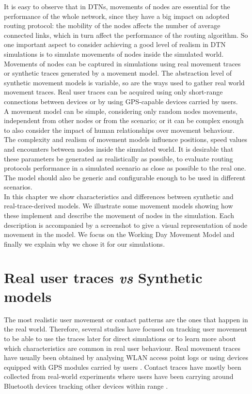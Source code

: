 It is easy to observe that in DTNs, movements of nodes are essential for the performance of the whole network, since they have a big impact on adopted routing protocol: the mobility of the nodes affects the number of average connected links, which in turn affect the performance of the routing algorithm.
So one important aspect to consider achieving a good level of realism in DTN simulations is to simulate movements of nodes inside the simulated world. 
\\

Movements of nodes can be captured in simulations using real movement traces or synthetic traces generated by a movement model. The abstraction level of synthetic movement models is variable, so are the ways used to gather real world movement traces. Real user traces can be acquired using only short-range connections between devices or by using GPS-capable devices carried by users.
\\

A movement model can be simple, considering only random nodes movements, independent from other nodes or from the scenario; or it can be complex enough to also consider the impact of human relationships over movement behaviour. The complexity and realism of movement models influence positions, speed values and encounters between nodes inside the simulated world. It is desirable that these parameters be generated as realistically as possible, to evaluate routing protocols performance in a simulated scenario as close as possible to the real one. The model should also be generic and configurable enough to be used in different scenarios.
\\

In this chapter we show characteristics and differences between synthetic and real-trace-derived models. We illustrate some movement models showing how these implement and describe the movement of nodes in the simulation. Each description is accompanied by a screenshot to give a visual representation of node movement in the model. We focus on the Working Day Movement Model and finally we explain why we chose it for our simulations.

\section{Real user traces \textit{vs} Synthetic models}
The most realistic user movement or contact patterns are the ones that happen in the real world. Therefore, several studies have focused on tracking user movement to be able to use the traces later for direct simulations or to learn more about which characteristics are common in real user behaviour. Real movement traces have usually been obtained by analysing WLAN access point logs \cite{Balachandran:2002:CUB:511399.511359} \cite{Ghosh:2006:PMP:1132983.1132993} \cite{Shaffer:2005:AMM:1104998.1105285} or using devices equipped with GPS modules carried by users \cite{Ashbrook:2002:LSL:862896.881068}. Contact traces have mostly been collected from real-world experiments where users have been carrying around Bluetooth devices tracking other devices within range \cite{Natarajan:2007:UUI:1762888.1762904}.
\\

